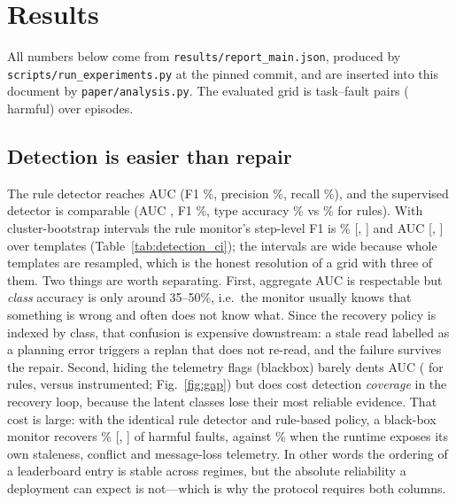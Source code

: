 \section{Results}\label{sec:results}

All numbers below come from \texttt{results/report\_main.json}, produced by
\texttt{scripts/run\_experiments.py} at the pinned commit, and are inserted into this document by
\texttt{paper/analysis.py}. The evaluated grid is \NumPairs{} task--fault pairs
(\NumHarmful{} harmful) over \NumEpisodes{} episodes.

\subsection{Detection is easier than repair}



The rule detector reaches AUC \AucRules{} (F1 \RulesFone\%, precision \RulesPrecision\%,
recall \RulesRecall\%), and the supervised detector is comparable (AUC \AucSupervised{}, F1
\SupFone\%, type accuracy \SupTypeAcc\% vs \RulesTypeAcc\% for rules). With cluster-bootstrap
intervals the rule monitor's step-level F1 is \RulesFone\% [\RulesFoneLo, \RulesFoneHi] and AUC
\AucRules{} [\AucRulesLo, \AucRulesHi] over \DetectionClusters{} templates
(Table~\ref{tab:detection_ci}); the intervals are wide because whole templates are resampled,
which is the honest resolution of a grid with three of them. Two things are worth
separating. First, aggregate AUC is respectable but \emph{class} accuracy is only around
35--50\%, i.e.\ the monitor usually knows that something is wrong and often does not know what.
Since the recovery policy is indexed by class, that confusion is expensive downstream: a stale read
labelled as a planning error triggers a replan that does not re-read, and the failure survives the
repair. Second, hiding the telemetry flags (blackbox) barely dents AUC (\AucRulesBlackbox{} for
rules, versus \AucRules{} instrumented; Fig.~\ref{fig:gap}) but does cost detection \emph{coverage}
in the recovery loop, because the latent classes lose their most reliable evidence. That cost is
large: with the identical rule detector and rule-based policy, a black-box monitor recovers
\BlackboxRecRules\% [\BlackboxRecRulesLo{}, \BlackboxRecRulesHi{}] of harmful faults, against
\RecRules\% when the runtime exposes its own staleness, conflict and message-loss telemetry. In
other words the ordering of a leaderboard entry is stable across regimes, but the absolute
reliability a deployment can expect is not---which is why the protocol requires both columns.

